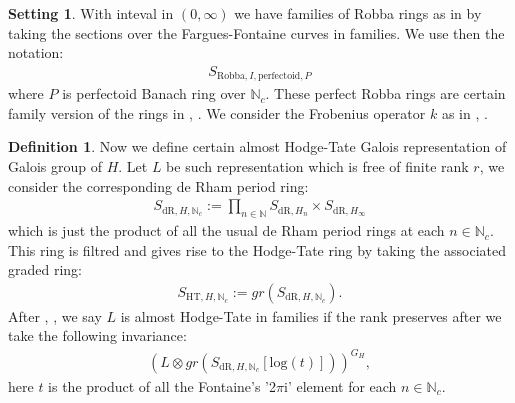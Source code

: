 \documentclass[12pt]{article}
\theoremstyle{definition}
\newtheorem{definition}{Definition}
\newtheorem{setting}{Setting}
\begin{document}
\begin{setting}
With inteval in $(0,\infty)$ we have families of Robba rings as in \cite{5LH} by taking the sections over the Fargues-Fontaine curves in families. We use then the notation:
\begin{align}
S_{\mathrm{Robba},I,\mathrm{perfectoid},P}
\end{align}
where $P$ is perfectoid Banach ring over $\mathbb{N}_c$. These perfect Robba rings are certain family version of the rings in \cite{5KLA}, \cite{5KLB}. We consider the Frobenius operator $k$ as in \cite{5KLA}, \cite{5KLB}.
\end{setting}



\begin{definition} \label{definition51}
Now we define certain almost Hodge-Tate Galois representation of Galois group of $H$. Let $L$ be such representation which is free of finite rank $r$, we consider the corresponding de Rham period ring:
\begin{align}
S_{\mathrm{dR},H,\mathbb{N}_c} := \prod_{n\in \mathbb{N}} S_{\mathrm{dR},H_n}\times S_{\mathrm{dR},H_\infty}
\end{align}
which is just the product of all the usual de Rham period rings at each $n\in \mathbb{N}_c$. This ring is filtred and gives rise to the Hodge-Tate ring by taking the associated graded ring:
\begin{align}
S_{\mathrm{HT},H,\mathbb{N}_c}:=gr(S_{\mathrm{dR},H,\mathbb{N}_c}).
\end{align}
After \cite{5F2}, \cite{5BLA}, \cite{5BLB} we say $L$ is almost Hodge-Tate in families if the rank preserves after we take the following invariance:
\begin{align}
(L\otimes gr(S_{\mathrm{dR},H,\mathbb{N}_c}[\mathrm{log}(t)]))^{G_H},
\end{align}
here $t$ is the product of all the Fontaine's '2$\pi$i' element for each $n\in \mathbb{N}_c$. 
\end{definition}
\end{document}
